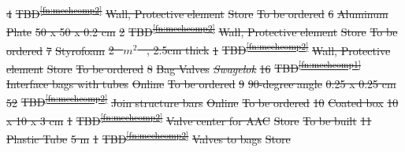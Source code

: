 \documentclass[a4paper,12pt,twoside]{article}
\providecommand{\DIFdeltex}[1]{{\protect\color{red}\sout{#1}}}                      %
\providecommand{\DIFdel}[1]{\texorpdfstring{\DIFdeltex{#1}}{}} %
\begin{document}
\begin{landscape}
\DIFdel{4 }%
\DIFdel{TBD\textsuperscript{\ref{fn:mechcomp2}} }%
\DIFdel{Wall, Protective element }%
\DIFdel{Store }%
\DIFdel{To be ordered }%
\DIFdel{6 }%
\DIFdel{Aluminum Plate }%
\DIFdel{50 x 50 x 0.2 cm }%
\DIFdel{2 }%
\DIFdel{TBD\textsuperscript{\ref{fn:mechcomp2}} }%
\DIFdel{Wall, Protective element }%
\DIFdel{Store }%
\DIFdel{To be ordered }%
\DIFdel{7 }%
\DIFdel{Styrofoam }%
\DIFdel{2 \mbox{%
$m^2$
}%
, 2.5cm thick }%
\DIFdel{1 }%
\DIFdel{TBD\textsuperscript{\ref{fn:mechcomp2}} }%
\DIFdel{Wall, Protective element }%
\DIFdel{Store }%
\DIFdel{To be ordered }%
\DIFdel{8 }%
\DIFdel{Bag Valves }%
\textit{\DIFdel{Swagelok}} %
\DIFdel{16 }%
\DIFdel{TBD\textsuperscript{\ref{fn:mechcomp1}} }%
\DIFdel{Interface bags with tubes }%
\DIFdel{Online }%
\DIFdel{To be ordered }%
\DIFdel{9 }%
\DIFdel{90-degree angle }%
\DIFdel{0.25 x 0.25 cm }%
\DIFdel{52 }%
\DIFdel{TBD\textsuperscript{\ref{fn:mechcomp2}} }%
\DIFdel{Join structure bars }%
\DIFdel{Online }%
\DIFdel{To be ordered }%
\DIFdel{10 }%
\DIFdel{Coated box }%
\DIFdel{10 x 10 x 3 cm }%
\DIFdel{1 }%
\DIFdel{TBD\textsuperscript{\ref{fn:mechcomp2}} }%
\DIFdel{Valve center for AAC }%
\DIFdel{Store }%
\DIFdel{To be built }%
\DIFdel{11 }%
\DIFdel{Plastic Tube }%
\DIFdel{5 m }%
\DIFdel{1 }%
\DIFdel{TBD\textsuperscript{\ref{fn:mechcomp2}} }%
\DIFdel{Valves to bags }%
\DIFdel{Store }%

\end{landscape}
\end{document}
